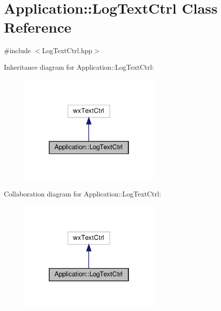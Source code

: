 \hypertarget{class_application_1_1_log_text_ctrl}{}\section{Application\+:\+:Log\+Text\+Ctrl Class Reference}
\label{class_application_1_1_log_text_ctrl}


{\ttfamily \#include $<$Log\+Text\+Ctrl.\+hpp$>$}



Inheritance diagram for Application\+:\+:Log\+Text\+Ctrl\+:
\nopagebreak
\begin{figure}[H]
\begin{center}
\leavevmode
\includegraphics[width=202pt]{class_application_1_1_log_text_ctrl__inherit__graph}
\end{center}
\end{figure}


Collaboration diagram for Application\+:\+:Log\+Text\+Ctrl\+:
\nopagebreak
\begin{figure}[H]
\begin{center}
\leavevmode
\includegraphics[width=202pt]{class_application_1_1_log_text_ctrl__coll__graph}
\end{center}
\end{figure}
